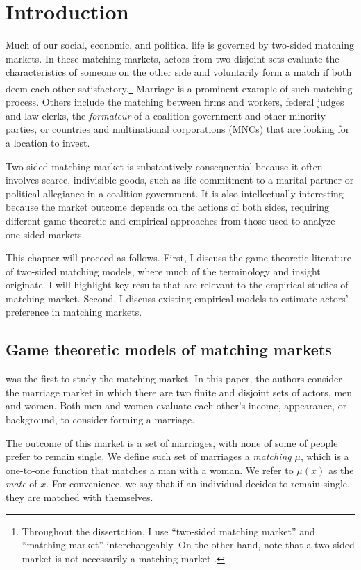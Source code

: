 \chapter{Introduction}

Much of our social, economic, and political life is governed by two-sided
matching markets. In these matching markets, actors from two disjoint sets evaluate the
characteristics of someone on the other side and
voluntarily form a match if both deem each other satisfactory.\footnote{Throughout the dissertation, I
  use ``two-sided matching market'' and ``matching market'' interchangeably. On
  the other hand, note that a two-sided market is not necessarily a
  matching market \citep{Rysman2009}.} Marriage is a prominent example
of such matching process. Others include the matching between firms and workers, federal
judges and law clerks, the \textit{formateur} of a coalition government and
other minority parties, or countries and multinational corporations (MNCs) that
are looking for a location to invest.

Two-sided matching market is substantively consequential because it often
involves scarce, indivisible goods, such as life commitment to a marital
partner or political allegiance in a coalition government. It is also
intellectually interesting because the market outcome depends on the actions of
both sides, requiring different game theoretic and empirical approaches from
those used to analyze one-sided markets.

This chapter will proceed as follows. First, I discuss the game theoretic literature of two-sided matching
models, where much of the terminology and insight originate. I will highlight
key results that are relevant to the empirical studies of matching market.
Second, I discuss existing empirical models to estimate actors' preference in matching markets.

\section{Game theoretic models of matching markets}

\citet{Gale1962} was the first to study the matching market. In this paper, the authors
consider the marriage market in which there are two finite and disjoint sets of
actors, men and women. Both men and women evaluate each other's income,
appearance, or background, to consider forming a marriage.

The outcome of this market is a set of marriages, with none of some of people
prefer to remain single. We define such set of marriages a \textit{matching} $\mu$, which
is a one-to-one function
that matches a man with a woman.  We refer to $\mu(x)$ as the \textit{mate} of
$x$. For convenience,
we say that if an individual decides to remain single, they are matched
with themselves.

